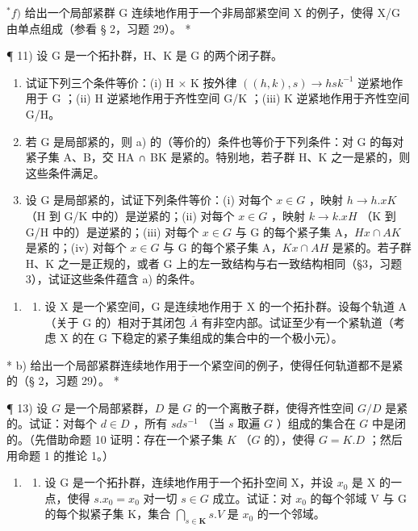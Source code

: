 \(^{*}f)\) 给出一个局部紧群 G 连续地作用于一个非局部紧空间 X 的例子，使得 X/G 由单点组成（参看 § 2，习题 29）。 *

¶ 11) 设 G 是一个拓扑群，H、K 是 G 的两个闭子群。

\begin{enumerate}
\def\labelenumi{\alph{enumi})}
\item
  试证下列三个条件等价：(i) H × K 按外律 \(((h, k), s) \rightarrow hsk^{-1}\) 逆紧地作用于 G ；(ii) H 逆紧地作用于齐性空间 G/K ；(iii) K 逆紧地作用于齐性空间 G/H。
\item
  若 G 是局部紧的，则 a) 的（等价的）条件也等价于下列条件：对 G 的每对紧子集 A、B，交 HA ∩ BK 是紧的。特别地，若子群 H、K 之一是紧的，则这些条件满足。
\item
  设 G 是局部紧的，试证下列条件等价：(i) 对每个 \(x \in G\) ，映射 \(h \to h.xK\) （H 到 G/K 中的）是逆紧的；(ii) 对每个 \(x \in G\) ，映射 \(k \to k.xH\) （K 到 G/H 中的）是逆紧的；(iii) 对每个 \(x \in G\) 与 G 的每个紧子集 A，\(Hx \cap AK\) 是紧的；(iv) 对每个 \(x \in G\) 与 G 的每个紧子集 A，\(Kx \cap AH\) 是紧的。若子群 H、K 之一是正规的，或者 G 上的左一致结构与右一致结构相同（§3，习题 3），试证这些条件蕴含 a) 的条件。
\end{enumerate}

\begin{enumerate}
\def\labelenumi{\arabic{enumi})}
\setcounter{enumi}{11}
\tightlist
\item
  \begin{enumerate}
  \def\labelenumii{\alph{enumii})}
  \tightlist
  \item
    设 X 是一个紧空间，G 是连续地作用于 X 的一个拓扑群。设每个轨道 A （关于 G 的）相对于其闭包 \(\overline{A}\) 有非空内部。试证至少有一个紧轨道（考虑 X 的在 G 下稳定的紧子集组成的集合中的一个极小元）。
  \end{enumerate}
\end{enumerate}

* b) 给出一个局部紧群连续地作用于一个紧空间的例子，使得任何轨道都不是紧的（§ 2，习题 29）。 *

¶ 13) 设 \(G\) 是一个局部紧群，\(D\) 是 \(G\) 的一个离散子群，使得齐性空间 \(G / D\) 是紧的。试证：对每个 \(d \in D\) ，所有 \(sds^{-1}\) （当 \(s\) 取遍 \(G\) ）组成的集合在 \(G\) 中是闭的。（先借助命题 10 证明：存在一个紧子集 \(K\) （\(G\) 的），使得 \(G = K.D\) ；然后用命题 1 的推论 1。）

\begin{enumerate}
\def\labelenumi{\arabic{enumi})}
\setcounter{enumi}{13}
\tightlist
\item
  \begin{enumerate}
  \def\labelenumii{\alph{enumii})}
  \tightlist
  \item
    设 G 是一个拓扑群，连续地作用于一个拓扑空间 X，并设 \(x_0\) 是 X 的一点，使得 \(s.x_0 = x_0\) 对一切 \(s \in G\) 成立。试证：对 \(x_0\) 的每个邻域 V 与 G 的每个拟紧子集 K，集合 \(\bigcap_{s \in \mathbf{K}} s.V\) 是 \(x_0\) 的一个邻域。
  \end{enumerate}
\end{enumerate}

